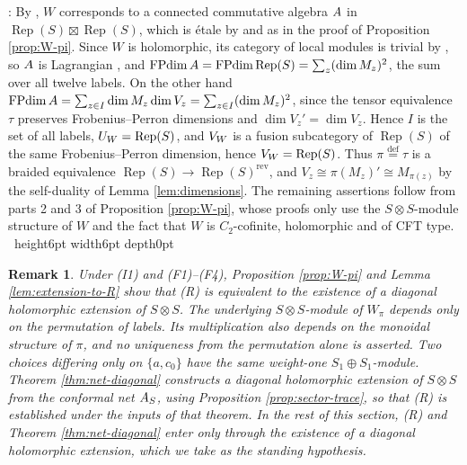 \documentclass[leqno]{article}
\let\cal\relax
\newcommand{\cal}{\mathcal}
\newcommand{\qed}{\hfill \vrule height6pt  width6pt depth0pt}
\newcommand{\ot}{\otimes}
\newcommand{\ov}{\overset}
\DeclareMathOperator{\Rep}{Rep}
\newtheorem{remark}[thm]{Remark}
\newenvironment{proof}[1][]{\noindent {\it Proof #1} : }{\hbox{~}\qed
\smallskip
}
\numberwithin{equation}{section}
\begin{document}
\begin{proof}
By \cite[Theorem 3.2 p.~10]{HKL15}, $W$ corresponds to a connected commutative algebra $\cal A$ in $\Rep(S) \boxtimes \Rep(S)$, which is étale by \cite[Theorem 5.12 p.~52]{CKM22} and \cite[Proposition 2.7 p.~5]{DMNO13} as in the proof of Proposition \ref{prop:W-pi}. Since $W$ is holomorphic, its category of local modules is trivial by \cite[Theorem 3.4 p.~16]{HKL15}, so $\cal A$ is Lagrangian \cite[Remark 4.3 and Corollary 3.32]{DMNO13}, and $\operatorname{FPdim}\cal A = \operatorname{FPdim}\Rep(S) = \sum_z (\dim M_z)^2$, the sum over all twelve labels. On the other hand $\operatorname{FPdim}\cal A = \sum_{z \in I}\dim M_z\dim V_z = \sum_{z \in I}(\dim M_z)^2$, since the tensor equivalence $\tau$ preserves Frobenius--Perron dimensions and $\dim V_z' = \dim V_z$. Hence $I$ is the set of all labels, $\cal U_W = \Rep(S)$, and $\cal V_W$ is a fusion subcategory of $\Rep(S)$ of the same Frobenius--Perron dimension, hence $\cal V_W = \Rep(S)$. Thus $\pi \ov{\mathrm{def}}{=} \tau$ is a braided equivalence $\Rep(S) \to \Rep(S)^{\mathrm{rev}}$, and $V_z \cong \pi(M_z)' \cong M_{\pi(z)}$ by the self-duality of Lemma \ref{lem:dimensions}. The remaining assertions follow from parts 2 and 3 of Proposition \ref{prop:W-pi}, whose proofs only use the $S \ot S$-module structure of $W$ and the fact that $W$ is $C_2$-cofinite, holomorphic and of CFT type.
\end{proof}

\begin{remark}\normalfont
\label{rem:where-R-enters}
Under (I1) and (F1)--(F4), Proposition \ref{prop:W-pi} and Lemma \ref{lem:extension-to-R} show that (R) is equivalent to the existence of a diagonal holomorphic extension of $S \ot S$. The underlying $S\ot S$-module of $W_\pi$ depends only on the permutation of labels. Its multiplication also depends on the monoidal structure of $\pi$, and no uniqueness from the permutation alone is asserted. Two choices differing only on $\{a,c_0\}$ have the same weight-one $S_1\oplus S_1$-module. Theorem \ref{thm:net-diagonal} constructs a diagonal holomorphic extension of $S \ot S$ from the conformal net $\cal A_S$, using Proposition \ref{prop:sector-trace}, so that (R) is established under the inputs of that theorem. In the rest of this section, (R) and Theorem \ref{thm:net-diagonal} enter only through the existence of a diagonal holomorphic extension, which we take as the standing hypothesis.
\end{remark}


\end{document}
